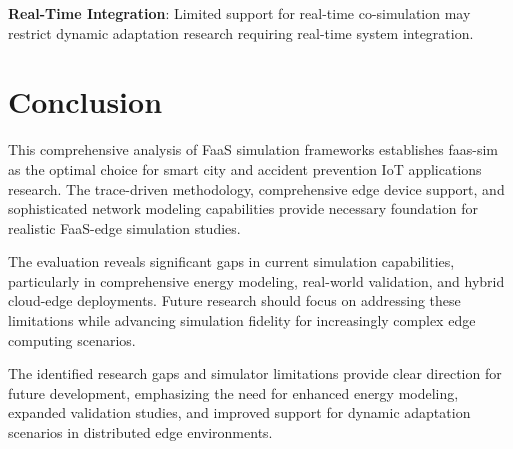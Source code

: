 \textbf{Real-Time Integration}: Limited support for real-time co-simulation may restrict dynamic adaptation research requiring real-time system integration.

\section{Conclusion}

This comprehensive analysis of FaaS simulation frameworks establishes faas-sim as the optimal choice for smart city and accident prevention IoT applications research. The trace-driven methodology, comprehensive edge device support, and sophisticated network modeling capabilities provide necessary foundation for realistic FaaS-edge simulation studies.

The evaluation reveals significant gaps in current simulation capabilities, particularly in comprehensive energy modeling, real-world validation, and hybrid cloud-edge deployments. Future research should focus on addressing these limitations while advancing simulation fidelity for increasingly complex edge computing scenarios.

The identified research gaps and simulator limitations provide clear direction for future development, emphasizing the need for enhanced energy modeling, expanded validation studies, and improved support for dynamic adaptation scenarios in distributed edge environments.